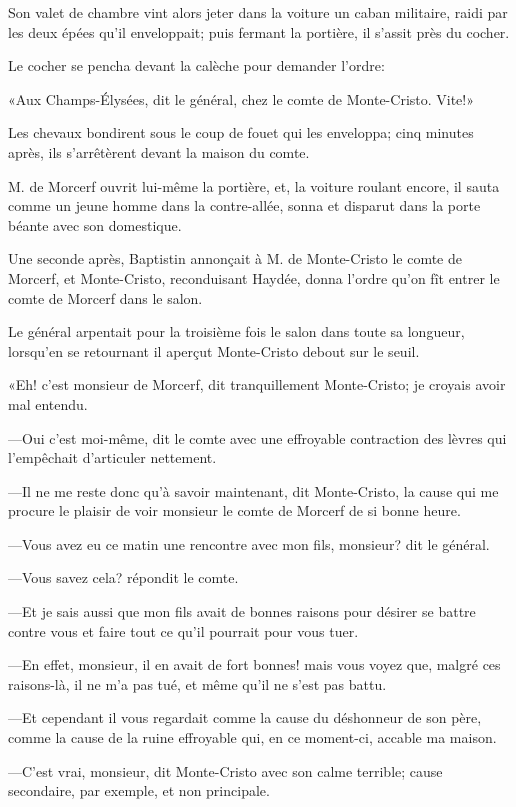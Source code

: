 Son valet de chambre vint alors jeter dans la voiture un caban militaire, raidi par les deux épées qu'il enveloppait; puis fermant la portière, il s'assit près du cocher. 

Le cocher se pencha devant la calèche pour demander l'ordre: 

«Aux Champs-Élysées, dit le général, chez le comte de Monte-Cristo. Vite!» 

Les chevaux bondirent sous le coup de fouet qui les enveloppa; cinq minutes après, ils s'arrêtèrent devant la maison du comte. 

M. de Morcerf ouvrit lui-même la portière, et, la voiture roulant encore, il sauta comme un jeune homme dans la contre-allée, sonna et disparut dans la porte béante avec son domestique. 

Une seconde après, Baptistin annonçait à M. de Monte-Cristo le comte de Morcerf, et Monte-Cristo, reconduisant Haydée, donna l'ordre qu'on fît entrer le comte de Morcerf dans le salon. 

Le général arpentait pour la troisième fois le salon dans toute sa longueur, lorsqu'en se retournant il aperçut Monte-Cristo debout sur le seuil. 

«Eh! c'est monsieur de Morcerf, dit tranquillement Monte-Cristo; je croyais avoir mal entendu. 

—Oui c'est moi-même, dit le comte avec une effroyable contraction des lèvres qui l'empêchait d'articuler nettement. 

—Il ne me reste donc qu'à savoir maintenant, dit Monte-Cristo, la cause qui me procure le plaisir de voir monsieur le comte de Morcerf de si bonne heure. 

—Vous avez eu ce matin une rencontre avec mon fils, monsieur? dit le général. 

—Vous savez cela? répondit le comte. 

—Et je sais aussi que mon fils avait de bonnes raisons pour désirer se battre contre vous et faire tout ce qu'il pourrait pour vous tuer. 

—En effet, monsieur, il en avait de fort bonnes! mais vous voyez que, malgré ces raisons-là, il ne m'a pas tué, et même qu'il ne s'est pas battu. 

—Et cependant il vous regardait comme la cause du déshonneur de son père, comme la cause de la ruine effroyable qui, en ce moment-ci, accable ma maison. 

—C'est vrai, monsieur, dit Monte-Cristo avec son calme terrible; cause secondaire, par exemple, et non principale. 

